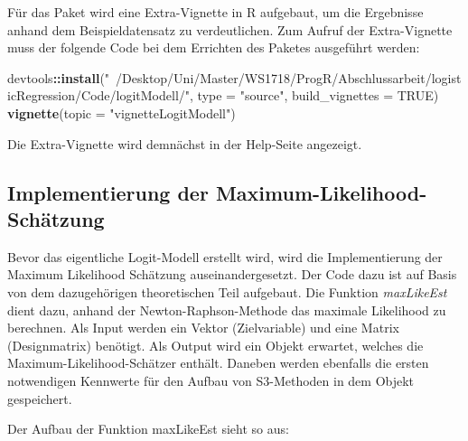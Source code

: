 \documentclass[12pt,]{article}
\newenvironment{Shaded}{\begin{snugshade}}{\end{snugshade}}
\newcommand{\KeywordTok}[1]{\textcolor[rgb]{0.13,0.29,0.53}{\textbf{#1}}}
\newcommand{\DataTypeTok}[1]{\textcolor[rgb]{0.13,0.29,0.53}{#1}}
\newcommand{\StringTok}[1]{\textcolor[rgb]{0.31,0.60,0.02}{#1}}
\newcommand{\CommentTok}[1]{\textcolor[rgb]{0.56,0.35,0.01}{\textit{#1}}}
\newcommand{\OtherTok}[1]{\textcolor[rgb]{0.56,0.35,0.01}{#1}}
\newcommand{\ControlFlowTok}[1]{\textcolor[rgb]{0.13,0.29,0.53}{\textbf{#1}}}
\newcommand{\OperatorTok}[1]{\textcolor[rgb]{0.81,0.36,0.00}{\textbf{#1}}}
\newcommand{\NormalTok}[1]{#1}
\begin{document}
Für das Paket wird eine Extra-Vignette in R aufgebaut, um die Ergebnisse
anhand dem Beispieldatensatz zu verdeutlichen. Zum Aufruf der
Extra-Vignette muss der folgende Code bei dem Errichten des Paketes
ausgeführt werden:

\begin{Shaded}
\begin{Highlighting}[]
\NormalTok{devtools}\OperatorTok{::}\KeywordTok{install}\NormalTok{(}\StringTok{"~/Desktop/Uni/Master/WS1718/ProgR/Abschlussarbeit/logisticRegression/Code/logitModell/"}\NormalTok{, }\DataTypeTok{type =} \StringTok{"source"}\NormalTok{, }\DataTypeTok{build_vignettes =} \OtherTok{TRUE}\NormalTok{)}
\KeywordTok{vignette}\NormalTok{(}\DataTypeTok{topic =} \StringTok{"vignetteLogitModell"}\NormalTok{)}
\end{Highlighting}
\end{Shaded}

Die Extra-Vignette wird demnächst in der Help-Seite angezeigt.

\subsection{Implementierung der
Maximum-Likelihood-Schätzung}\label{implementierung-der-maximum-likelihood-schatzung}

Bevor das eigentliche Logit-Modell erstellt wird, wird die
Implementierung der Maximum Likelihood Schätzung auseinandergesetzt. Der
Code dazu ist auf Basis von dem dazugehörigen theoretischen Teil
aufgebaut. Die Funktion \emph{maxLikeEst} dient dazu, anhand der
Newton-Raphson-Methode das maximale Likelihood zu berechnen. Als Input
werden ein Vektor (Zielvariable) und eine Matrix (Designmatrix)
benötigt. Als Output wird ein Objekt erwartet, welches die
Maximum-Likelihood-Schätzer enthält. Daneben werden ebenfalls die ersten
notwendigen Kennwerte für den Aufbau von S3-Methoden in dem Objekt
gespeichert.

Der Aufbau der Funktion maxLikeEst sieht so aus:

\begin{Shaded}
\end{Shaded}
\end{document}
